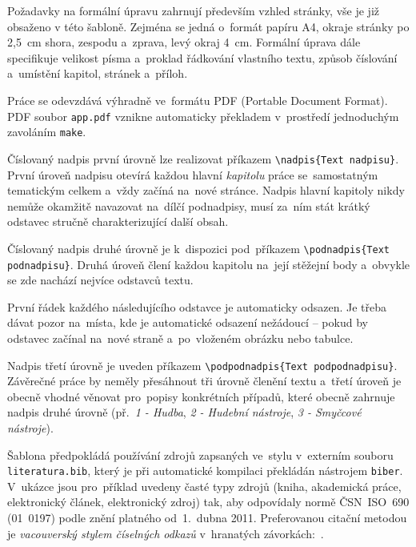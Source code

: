 Požadavky na formální úpravu zahrnují především vzhled stránky, vše je již
obsaženo v této šabloně. Zejména se jedná o~formát papíru A4, okraje stránky
po 2,5~cm shora, zespodu a~zprava, levý okraj 4~cm.  Formální úprava dále
specifikuje velikost písma a~proklad řádkování vlastního textu, způsob číslování
a~umístění kapitol, stránek a~příloh.

Práce se odevzdává výhradně ve~formátu PDF (Portable Document Format). PDF
soubor \texttt{app.pdf} vznikne automaticky překladem v~prostředí \XeLaTeX
jednoduchým zavoláním \texttt{make}.

Číslovaný nadpis první úrovně lze realizovat příkazem
\texttt{{\textbackslash}nadpis\{Text nadpisu\}}. První úroveň nadpisu otevírá
každou hlavní \emph{kapitolu} práce se~samostatným tematickým celkem a~vždy
začíná na~nové stránce. Nadpis hlavní kapitoly nikdy nemůže okamžitě navazovat
na~dílčí podnadpisy, musí za~ním stát krátký odstavec stručně charakterizující
další obsah.

Číslovaný nadpis druhé úrovně je k~dispozici pod~příkazem
\texttt{{\textbackslash}podnadpis\{Text podnadpisu\}}. Druhá úroveň člení každou
kapitolu na~její stěžejní body a~obvykle se zde nachází nejvíce odstavců textu.

První řádek každého následujícího odstavce je automaticky odsazen. Je třeba
dávat pozor na~místa, kde je automatické odsazení nežádoucí -- pokud
by odstavec začínal na~nové straně a~po~vloženém obrázku nebo tabulce.

Nadpis třetí úrovně je uveden příkazem
\texttt{{\textbackslash}podpodnadpis\{Text podpodnadpisu\}}. Závěrečné práce by
neměly přesáhnout tři úrovně členění textu a~třetí úroveň je obecně vhodné
věnovat pro~popisy konkrétních případů, které obecně zahrnuje nadpis druhé
úrovně (př.~\textit{1 - Hudba}, \textit{2 - Hudební nástroje}, \textit{3 -
Smyčcové nástroje}).


Šablona předpokládá používání zdrojů zapsaných ve~stylu 
v~externím souboru \texttt{literatura.bib}, který je při automatické kompilaci
překládán nástrojem \texttt{biber}. V~ukázce jsou pro~příklad uvedeny časté typy
zdrojů (kniha, akademická práce, elektronický článek, elektronický zdroj) tak,
aby odpovídaly normě ČSN~ISO~690 (01~0197) podle znění platného od~1.~dubna
2011. Preferovanou citační metodou je \emph{vacouverský stylem číselných odkazů}
v~hranatých závorkách:~\cite[19]{hladena19}.

